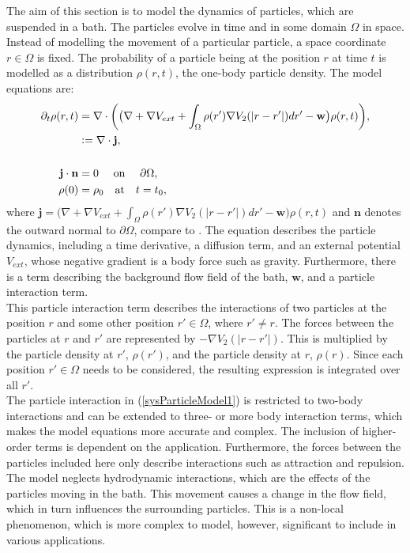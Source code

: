 
The aim of this section is to model the dynamics of particles, which are suspended in a bath. The particles evolve in time and in some domain $\Omega$ in space. Instead of modelling the movement of a particular particle, a space coordinate $r \in \Omega$ is fixed. The probability of a particle being at the position $r$ at time $t$ is modelled as a  distribution $\rho(r,t)$, the one-body particle density.
The model equations are:
\begin{align}\label{sysParticleModel1}
\partial_t \rho(r,t) &= \nabla \cdot \bigg(\big(\nabla  + \nabla V_{ext} + \int_\Omega \rho(r') \nabla V_2(|r-r'|)dr' - \mathbf{w} \big) \rho(r,t) \bigg),\\
&:=\nabla \cdot \mathbf{j},\notag \\
\notag  \\
\mathbf{j} \cdot \mathbf{n}&=0 \quad  \ \text{on   } \quad  \partial \Omega, \notag  \\
\rho(0) &=\rho_0 \quad \text{at} \quad t=t_0, \notag 
\end{align}
where $\mathbf{j}=\big(\nabla  + \nabla V_{ext} + \int_\Omega \rho(r') \nabla V_2(|r-r'|)dr' - \mathbf{w} \big) \rho(r,t) $ and $\mathbf{n}$ denotes the outward normal to $\partial \Omega$, compare to \cite{RexLoewen1}.
 The equation describes the particle dynamics, including a time derivative, a diffusion term, and an external potential $V_{ext}$, whose negative gradient is a body force such as gravity. Furthermore, there is a term describing the background flow field of the bath, $\mathbf{w}$, and a particle interaction term.\\
 This particle interaction term describes the interactions of two particles at the position $r$ and some other position $r' \in \Omega$, where $r' \neq r$. The forces between the particles at $r$ and  $r'$ are represented by $-\nabla V_2(|r-r'|)$. This is multiplied by the particle density at $r'$, $\rho(r')$, and the particle density at $r$, $\rho(r)$. Since each position $r' \in \Omega$ needs to be considered, the resulting expression is integrated over all $r'$.\\
The particle interaction in (\ref{sysParticleModel1}) is restricted to two-body interactions and can be extended to three- or more body interaction terms, which makes the model equations more accurate and complex. The inclusion of higher-order terms is dependent on the application. Furthermore, the forces between the particles included here only describe interactions such as attraction and repulsion. The model neglects hydrodynamic interactions, which are the effects of the particles moving in the bath. This movement causes a change in the flow field, which in turn influences the surrounding particles. This is a non-local phenomenon, which is more complex to model, however, significant to include in various applications. 

